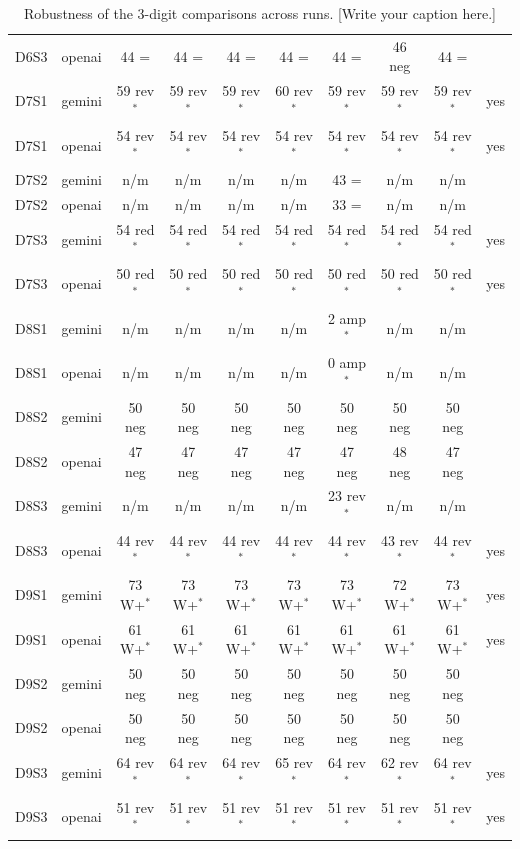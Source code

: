 \begin{table}[t]
{\begin{tabular}{@{}llcccccccc@{}}
D6S3 & openai & 44 = & 44 = & 44 = & 44 = & 44 = & 46 neg & 44 = &  \\
D7S1 & gemini & 59 rev$^{*}$ & 59 rev$^{*}$ & 59 rev$^{*}$ & 60 rev$^{*}$ & 59 rev$^{*}$ & 59 rev$^{*}$ & 59 rev$^{*}$ & yes \\
D7S1 & openai & 54 rev$^{*}$ & 54 rev$^{*}$ & 54 rev$^{*}$ & 54 rev$^{*}$ & 54 rev$^{*}$ & 54 rev$^{*}$ & 54 rev$^{*}$ & yes \\
D7S2 & gemini & n/m & n/m & n/m & n/m & 43 = & n/m & n/m &  \\
D7S2 & openai & n/m & n/m & n/m & n/m & 33 = & n/m & n/m &  \\
D7S3 & gemini & 54 red$^{*}$ & 54 red$^{*}$ & 54 red$^{*}$ & 54 red$^{*}$ & 54 red$^{*}$ & 54 red$^{*}$ & 54 red$^{*}$ & yes \\
D7S3 & openai & 50 red$^{*}$ & 50 red$^{*}$ & 50 red$^{*}$ & 50 red$^{*}$ & 50 red$^{*}$ & 50 red$^{*}$ & 50 red$^{*}$ & yes \\
D8S1 & gemini & n/m & n/m & n/m & n/m & 2 amp$^{*}$ & n/m & n/m &  \\
D8S1 & openai & n/m & n/m & n/m & n/m & 0 amp$^{*}$ & n/m & n/m &  \\
D8S2 & gemini & 50 neg & 50 neg & 50 neg & 50 neg & 50 neg & 50 neg & 50 neg &  \\
D8S2 & openai & 47 neg & 47 neg & 47 neg & 47 neg & 47 neg & 48 neg & 47 neg &  \\
D8S3 & gemini & n/m & n/m & n/m & n/m & 23 rev$^{*}$ & n/m & n/m &  \\
D8S3 & openai & 44 rev$^{*}$ & 44 rev$^{*}$ & 44 rev$^{*}$ & 44 rev$^{*}$ & 44 rev$^{*}$ & 43 rev$^{*}$ & 44 rev$^{*}$ & yes \\
D9S1 & gemini & 73 W+$^{*}$ & 73 W+$^{*}$ & 73 W+$^{*}$ & 73 W+$^{*}$ & 73 W+$^{*}$ & 72 W+$^{*}$ & 73 W+$^{*}$ & yes \\
D9S1 & openai & 61 W+$^{*}$ & 61 W+$^{*}$ & 61 W+$^{*}$ & 61 W+$^{*}$ & 61 W+$^{*}$ & 61 W+$^{*}$ & 61 W+$^{*}$ & yes \\
D9S2 & gemini & 50 neg & 50 neg & 50 neg & 50 neg & 50 neg & 50 neg & 50 neg &  \\
D9S2 & openai & 50 neg & 50 neg & 50 neg & 50 neg & 50 neg & 50 neg & 50 neg &  \\
D9S3 & gemini & 64 rev$^{*}$ & 64 rev$^{*}$ & 64 rev$^{*}$ & 65 rev$^{*}$ & 64 rev$^{*}$ & 62 rev$^{*}$ & 64 rev$^{*}$ & yes \\
D9S3 & openai & 51 rev$^{*}$ & 51 rev$^{*}$ & 51 rev$^{*}$ & 51 rev$^{*}$ & 51 rev$^{*}$ & 51 rev$^{*}$ & 51 rev$^{*}$ & yes \\
\bottomrule
\end{tabular}}
\caption{Robustness of the 3-digit comparisons across runs. [Write your caption here.]}
\label{tab:robustness}
\end{table}
